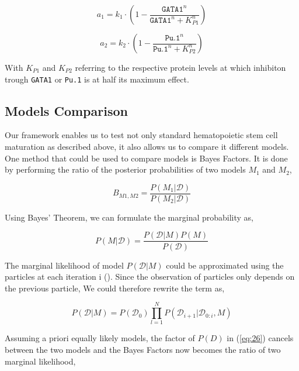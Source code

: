 \documentclass{bioinfo}
\begin{document}
\begin{equation}
a_1 = k_1 \cdot (1 - \frac{\texttt{GATA1}^{n}}{\texttt{GATA1}^{n} + K_{P1}^{n}})\label{eq:24}
\end{equation}

\begin{equation}
a_2 = k_2 \cdot (1 - \frac{\texttt{Pu.1}^{n}}{\texttt{Pu.1}^{n} + K_{P2}^{n}})\label{eq:25}
\end{equation}

With $K_{P1}$ and $K_{P2}$ referring to the respective protein levels at which inhibiton trough \texttt{GATA1} or \texttt{Pu.1} is at half its maximum effect.

\subsection{Models Comparison}

Our framework enables us to test not only standard hematopoietic stem cell maturation as described above, it also allows us to compare it different models. One method that could be used to compare models is Bayes Factors. It is done by performing the ratio of the posterior probabilities of two models $M_1$ and $M_2$,

\begin{equation}
B_{M1, M2} = \frac{P(M_1 | \mathcal{D})}{P(M_2 | \mathcal{D})}\label{eq:26}
\end{equation}

Using Bayes' Theorem, we can formulate the marginal probability as,

\begin{equation}
P(M | \mathcal{D}) = \frac{P(\mathcal{D} | M) P(M)}{P(\mathcal{D})}\label{eq:27}
\end{equation}

The marginal likelihood of model $P(\mathcal{D} | M)$ could be approximated using the particles at each iteration i (\citealp{Wilkinson11}). Since the observation of particles only depends on the previous particle, We could therefore rewrite the term as,

\begin{equation}
P(\mathcal{D} | M) = P(\mathcal{D_0}) \prod_{l=1}^{N} P(\mathcal{D}_{i+1} | \mathcal{D}_{0:i}, M)\label{eq:28}
\end{equation}

Assuming a priori equally likely models, the factor of $P(D)$ in (\ref{eq:26}) cancels between the two models and the Bayes Factors now becomes the ratio of two marginal likelihood,
\end{document}
